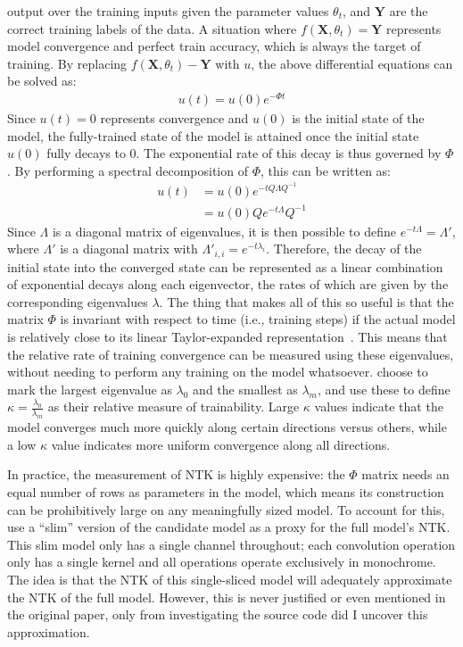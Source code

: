 output over the training inputs given the parameter values $\theta_t$,
and $\mathbf{Y}$ are the correct training labels
of the data.
A situation where $f(\mathbf{X}, \theta_t) = \mathbf{Y}$ represents model convergence and perfect train accuracy, which is always the target
of training. By replacing $f(\mathbf{X}, \theta_t) - \mathbf{Y}$ with $u$, the above differential equations can be solved as:
\begin{align}
    u(t) = u(0) e^{-\Phi t}
\end{align}
Since $u(t)=0$ represents convergence and $u(0)$ is the initial state of the model, the fully-trained state of the model
is attained once the initial state $u(0)$ fully decays to 0. The exponential rate of this decay is thus governed
by $\Phi$. By performing a spectral decomposition of $\Phi$, this can be written as:
\begin{align}
    u(t) &= u(0) e^{-t Q\Lambda Q^{-1}} \\
         &= u(0) Q e^{-t \Lambda} Q^{-1}
\end{align}
Since $\Lambda$ is a diagonal matrix of eigenvalues, it is then possible to define $e^{-t \Lambda}=\Lambda'$, where $\Lambda'$ is a diagonal
matrix with $\Lambda'_{i,i}=e^{-t \lambda_i}$. Therefore, the decay of the initial state into the converged
state can be represented as a linear combination of exponential decays along each eigenvector, the rates of which are given by the
corresponding eigenvalues $\lambda$. The thing that makes all of this so useful is that the matrix $\Phi$ is invariant with respect to time (i.e., training steps)
if the actual model is relatively close to its linear Taylor-expanded representation~\citep{dwaraknath2014}.
This means that the relative rate of training convergence can be measured using these eigenvalues, without needing to
perform any training on the model whatsoever. \citeauthor{chen2021} choose to mark the largest eigenvalue as $\lambda_0$
and the smallest as $\lambda_m$, and use these to define $\kappa = \frac{\lambda_0}{\lambda_m}$ as their relative measure of trainability.
Large $\kappa$ values indicate that the model converges much more quickly along certain directions versus others, while a low
$\kappa$ value indicates more uniform convergence along all directions.

In practice, the measurement of NTK is highly expensive: the $\Phi$ matrix needs an equal number of rows as parameters in
the model, which means its construction can be prohibitively large on any meaningfully sized model. To account for this,
\citeauthor{chen2021} use a ``slim'' version of the candidate model as a proxy for the full model's NTK. This slim model
only has a single channel throughout; each convolution operation only has a single kernel and all operations operate
exclusively in monochrome. The idea is that the NTK of this single-sliced model will adequately approximate the NTK
of the full model. However, this is never justified or even mentioned in the original paper,
only from investigating the source code did I uncover this approximation.

